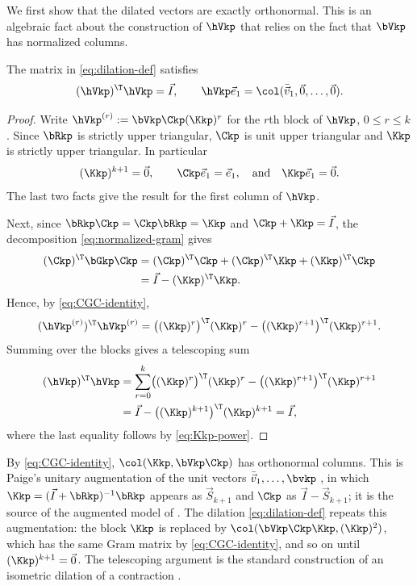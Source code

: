 We first show that the dilated vectors are exactly orthonormal.
This is an algebraic fact about the construction of $\hVkp$ that relies on the fact that $\bVkp$ has normalized columns.

\begin{lemma}
\label{lem:dilation}
The matrix in \cref{eq:dilation-def} satisfies
\[
 (\hVkp)^\T \hVkp=\vec I,
 \qquad
 \hVkp\vec e_1=\col(\bar{\vec v}_1,\vec0,\ldots,\vec0).
\]
\end{lemma}

\begin{proof}
Write \(\hVkp^{(r)}:=\bVkp\Ckp(\Kkp)^r\) for the \(r\)th block of \(\hVkp\), \(0\le r\le k\).
Since \(\bRkp\) is strictly upper triangular, \(\Ckp\) is unit upper triangular and \(\Kkp\) is strictly upper triangular.
In particular 
\begin{equation}
  (\Kkp)^{k+1}=\vec0,\qquad \Ckp\vec e_1=\vec e_1, \quad\text{and}\quad \Kkp\vec e_1=\vec0.
  \label{eq:Kkp-power}
\end{equation}
The last two facts give the result for the first column of \(\hVkp\).

Next, since \(\bRkp\Ckp=\Ckp\bRkp=\Kkp\) and \(\Ckp+\Kkp=\vec I\), the decomposition \cref{eq:normalized-gram} gives
\begin{align}
  (\Ckp)^\T\bGkp\Ckp
  &=(\Ckp)^\T\Ckp+(\Ckp)^\T\Kkp+(\Kkp)^\T\Ckp \nonumber
  \\
  &=\vec I-(\Kkp)^\T\Kkp.
 \label{eq:CGC-identity}
\end{align}
Hence, by \cref{eq:CGC-identity},
\[
 (\hVkp^{(r)})^\T\hVkp^{(r)}
 =\bigl((\Kkp)^r\bigr)^\T(\Kkp)^r-\bigl((\Kkp)^{r+1}\bigr)^\T(\Kkp)^{r+1}.
\]
Summing over the blocks gives a telescoping sum
\begin{align*}
 (\hVkp)^\T\hVkp
 &=\sum_{r=0}^{k}\bigl((\Kkp)^r\bigr)^\T(\Kkp)^r-\bigl((\Kkp)^{r+1}\bigr)^\T(\Kkp)^{r+1}
 \\
 &=\vec I-\bigl((\Kkp)^{k+1}\bigr)^\T(\Kkp)^{k+1}
 =\vec I,
\end{align*}
where the last equality follows by \cref{eq:Kkp-power}.
\end{proof}

\begin{remark}
\label{rem:dilation-origin}
By \cref{eq:CGC-identity}, \(\col(\Kkp,\bVkp\Ckp)\) has orthonormal columns.
This is Paige's unitary augmentation of the unit vectors \(\bar{\vec v}_1,\ldots,\bvkp\) \cite[Theorem~2.1]{paige2009}, in which \(\Kkp=(\vec I+\bRkp)^{-1}\bRkp\) appears as \(\vec S_{k+1}\) and \(\Ckp\) as \(\vec I-\vec S_{k+1}\); it is the source of the augmented model of \cite{paige2010}.
The dilation \cref{eq:dilation-def} repeats this augmentation: the block \(\Kkp\) is replaced by \(\col(\bVkp\Ckp\Kkp,(\Kkp)^2)\), which has the same Gram matrix by \cref{eq:CGC-identity}, and so on until \((\Kkp)^{k+1}=\vec0\).
The telescoping argument is the standard construction of an isometric dilation of a contraction \cite{schaffer1955,sznagy_foias_bercovici_kerchy2010}.
\end{remark}

